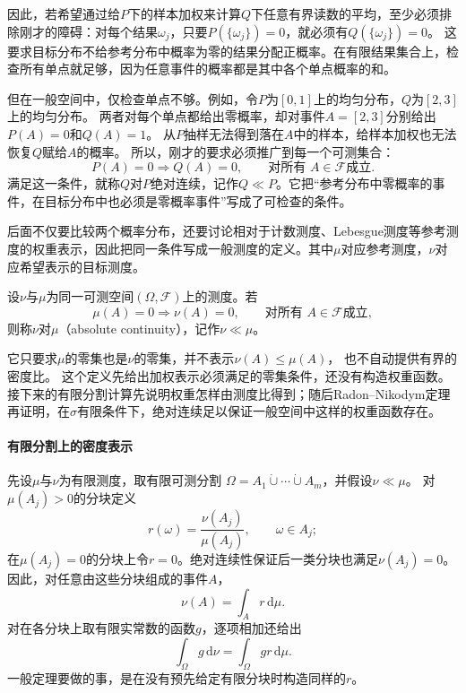 因此，若希望通过给\(P\)下的样本加权来计算\(Q\)下任意有界读数的平均，至少必须排除刚才的障碍：对每个结果\(\omega_j\)，只要\(P(\{\omega_j\})=0\)，就必须有\(Q(\{\omega_j\})=0\)。
这要求目标分布不给参考分布中概率为零的结果分配正概率。在有限结果集合上，检查所有单点就足够，因为任意事件的概率都是其中各个单点概率的和。

但在一般空间中，仅检查单点不够。例如，令\(P\)为\([0,1]\)上的均匀分布，\(Q\)为\([2,3]\)上的均匀分布。
两者对每个单点都给出零概率，却对事件\(A=[2,3]\)分别给出\(P(A)=0\)和\(Q(A)=1\)。
从\(P\)抽样无法得到落在\(A\)中的样本，给样本加权也无法恢复\(Q\)赋给\(A\)的概率。
所以，刚才的要求必须推广到每一个可测集合：
\[
  P(A)=0\Longrightarrow Q(A)=0,
  \qquad\text{对所有 }A\in\mathcal F\text{成立}.
\]
满足这一条件，就称\(Q\)对\(P\)绝对连续，记作\(Q\ll P\)。它把“参考分布中零概率的事件，在目标分布中也必须是零概率事件”写成了可检查的条件。

后面不仅要比较两个概率分布，还要讨论相对于计数测度、Lebesgue测度等参考测度的权重表示，因此把同一条件写成一般测度的定义。其中\(\mu\)对应参考测度，\(\nu\)对应希望表示的目标测度。
\begin{definition}[测度的绝对连续]
\label{def:probability-absolute-continuity}
设\(\nu\)与\(\mu\)为同一可测空间\((\Omega,\mathcal{F})\)上的测度。若
\[ \mu(A)=0\Longrightarrow\nu(A)=0,
  \qquad\text{对所有 }A\in\mathcal{F}\text{成立}, \]
则称\(\nu\)对\(\mu\)（absolute continuity），记作\(\nu\ll\mu\)。
\end{definition}
它只要求\(\mu\)的零集也是\(\nu\)的零集，并不表示\(\nu(A)\leq\mu(A)\)，
也不自动提供有界的密度比。
这个定义先给出加权表示必须满足的零集条件，还没有构造权重函数。
接下来的有限分割计算先说明权重怎样由测度比得到；随后Radon--Nikodym定理再证明，在\(\sigma\)有限条件下，绝对连续足以保证一般空间中这样的权重函数存在。

\paragraph{有限分割上的密度表示}
先设\(\mu\)与\(\nu\)为有限测度，取有限可测分割
\(\Omega=A_1\mathbin{\dot\cup}\cdots\mathbin{\dot\cup}A_m\)，并假设\(\nu\ll\mu\)。
对\(\mu(A_j)>0\)的分块定义
\[ r(\omega)=\frac{\nu(A_j)}{\mu(A_j)},
  \qquad \omega\in A_j; \]
在\(\mu(A_j)=0\)的分块上令\(r=0\)。绝对连续性保证后一类分块也满足\(\nu(A_j)=0\)。因此，对任意由这些分块组成的事件\(A\)，
\[ \nu(A)=\int_A r\,\mathrm{d}\mu. \]
对在各分块上取有限实常数的函数\(g\)，逐项相加还给出
\begin{equation}
  \int_{\Omega}g\,\mathrm{d}\nu
  =
  \int_{\Omega}gr\,\mathrm{d}\mu.
  \label{eq:probability-finite-change-measure}
\end{equation}
一般定理要做的事，是在没有预先给定有限分块时构造同样的\(r\)。

